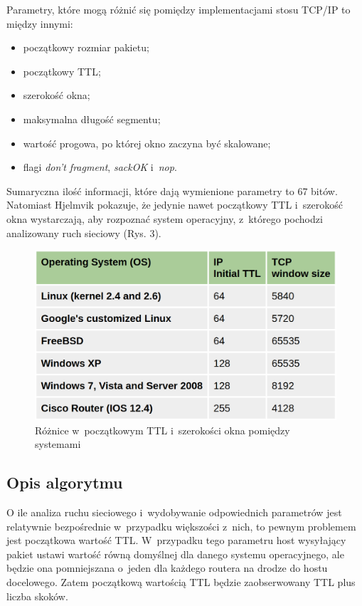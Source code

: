 
Parametry, które mogą różnić się pomiędzy implementacjami stosu TCP/IP to między
innymi:
\begin{itemize}
	\item początkowy rozmiar pakietu;
	\item początkowy TTL;
	\item szerokość okna;
	\item maksymalna długość segmentu;
	\item wartość progowa, po której okno zaczyna być skalowane;
	\item flagi \emph{don't fragment}, \emph{sackOK} i~\emph{nop}.
\end{itemize}

Sumaryczna ilość informacji, które dają wymienione parametry to 67 bitów.
Natomiast Hjelmvik \cite{hjelmvik2011passive} pokazuje, że jedynie nawet
początkowy TTL i~szerokość okna wystarczają, aby rozpoznać system operacyjny,
z~którego pochodzi analizowany ruch sieciowy (Rys. 3).

\begin{figure}
	\includegraphics[width=\textwidth,keepaspectratio]{img/03}
	\caption{Różnice w~początkowym TTL i~szerokości okna pomiędzy systemami}
\end{figure}

\subsection{Opis algorytmu}
O ile analiza ruchu sieciowego i~wydobywanie odpowiednich parametrów jest
relatywnie bezpośrednie w~przypadku większości z~nich, to pewnym problemem jest
początkowa wartość TTL. W~przypadku tego parametru host wysyłający pakiet ustawi
wartość równą domyślnej dla danego systemu operacyjnego, ale będzie ona
pomniejszana o~jeden dla każdego routera na drodze do hostu docelowego. Zatem
początkową wartością TTL będzie zaobserwowany TTL plus liczba skoków.

